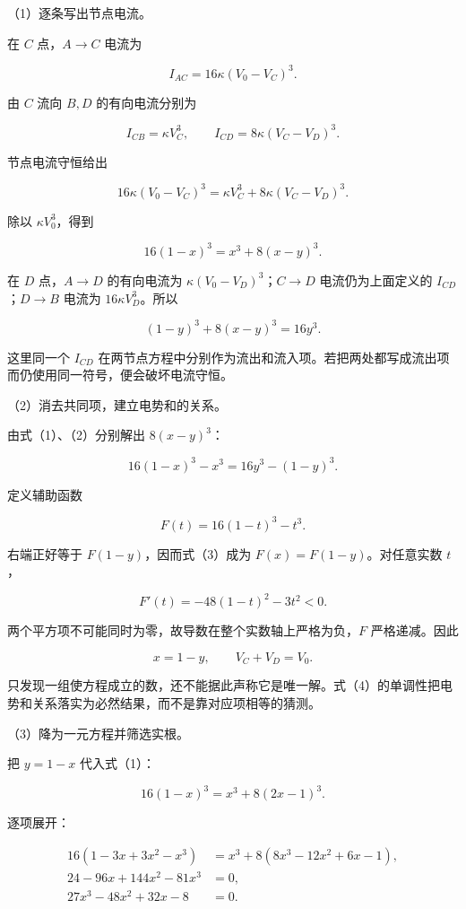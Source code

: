 \documentclass[12pt,a4paper,fontset=fandol]{ctexart}
\begin{document}
（1）逐条写出节点电流。

在 \(C\) 点，\(A\to C\) 电流为

\[
I_{AC}=16\kappa(V_0-V_C)^3.
\]

由 \(C\) 流向 \(B,D\) 的有向电流分别为

\[
I_{CB}=\kappa V_C^3,\qquad I_{CD}=8\kappa(V_C-V_D)^3.
\]

节点电流守恒给出

\[
16\kappa(V_0-V_C)^3=\kappa V_C^3+8\kappa(V_C-V_D)^3.
\]

除以 \(\kappa V_0^3\)，得到

\[
16(1-x)^3=x^3+8(x-y)^3. \tag{1}
\]

在 \(D\) 点，\(A\to D\) 的有向电流为 \(\kappa(V_0-V_D)^3\)；\(C\to D\)
电流仍为上面定义的 \(I_{CD}\)；\(D\to B\) 电流为
\(16\kappa V_D^3\)。所以

\[
(1-y)^3+8(x-y)^3=16y^3. \tag{2}
\]

这里同一个 \(I_{CD}\)
在两节点方程中分别作为流出和流入项。若把两处都写成流出项而仍使用同一符号，便会破坏电流守恒。

（2）消去共同项，建立电势和的关系。

由式（1）、（2）分别解出 \(8(x-y)^3\)：

\[
16(1-x)^3-x^3=16y^3-(1-y)^3. \tag{3}
\]

定义辅助函数

\[
F(t)=16(1-t)^3-t^3.
\]

右端正好等于 \(F(1-y)\)，因而式（3）成为 \(F(x)=F(1-y)\)。对任意实数
\(t\)，

\[
F'(t)=-48(1-t)^2-3t^2<0. \tag{4}
\]

两个平方项不可能同时为零，故导数在整个实数轴上严格为负，\(F\)
严格递减。因此

\[
x=1-y,\qquad V_C+V_D=V_0. \tag{5}
\]

只发现一组使方程成立的数，还不能据此声称它是唯一解。式（4）的单调性把电势和关系落实为必然结果，而不是靠对应项相等的猜测。

（3）降为一元方程并筛选实根。

把 \(y=1-x\) 代入式（1）：

\[
16(1-x)^3=x^3+8(2x-1)^3.
\]

逐项展开：

\[
\begin{aligned}
16(1-3x+3x^2-x^3)
&=x^3+8(8x^3-12x^2+6x-1),\\
24-96x+144x^2-81x^3&=0,\\
27x^3-48x^2+32x-8&=0.
\end{aligned}
\]
\end{document}
